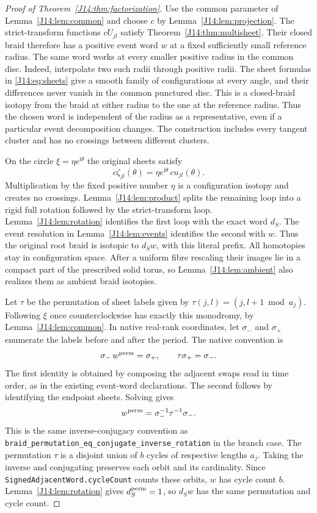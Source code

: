 \documentclass[11pt,oneside]{report}
\theoremstyle{definition}
\numberwithin{equation}{section}
\newcommand{\decl}[1]{\textnormal{\nolinkurl{#1}}}
\newcommand{\ii}{\mathrm i}
\begin{document}
\begin{proof}[Proof of Theorem~\ref{J14:thm:factorization}]
Use the common parameter of Lemma~\ref{J14:lem:common} and choose $c$ by
Lemma~\ref{J14:lem:projection}. The strict-transform functions $cU_{jl}$ satisfy
Theorem~\ref{J14:thm:multisheet}. Their closed braid therefore has a positive
event word $w$ at a fixed sufficiently small reference radius.
The same word works at every smaller positive radius in the common disc.
Indeed, interpolate two such radii through positive radii. The sheet
formulas in \eqref{J14:eq:sheets} give a smooth family of configurations at
every angle, and their differences never vanish in the common punctured
disc. This is a closed-braid isotopy from the braid at either radius to the
one at the reference radius. Thus the chosen word is independent of the
radius as a representative, even if a particular event decomposition
changes. The construction includes every tangent cluster and has no
crossings between different clusters.

On the circle $\xi=\eta e^{\ii\theta}$ the original sheets satisfy
\[
 c\zeta_{jl}(\theta)=\eta e^{\ii\theta}\,c u_{jl}(\theta).
\]
Multiplication by the fixed positive number $\eta$ is a configuration
isotopy and creates no crossings. Lemma~\ref{J14:lem:product} splits the remaining
loop into a rigid full rotation followed by the strict-transform loop.
Lemma~\ref{J14:lem:rotation} identifies the first loop with the exact word $d_S$.
The event resolution in Lemma~\ref{J14:lem:events} identifies the second with
$w$. Thus the original root braid is isotopic to $d_Sw$, with this literal
prefix. All homotopies stay in configuration space. After a uniform fibre
rescaling their images lie in a compact part of the prescribed solid torus,
so Lemma~\ref{J14:lem:ambient} also realizes them as ambient braid isotopies.

Let $\tau$ be the permutation of sheet labels given by
$\tau(j,l)=(j,l+1\bmod a_j)$. Following $\xi$ once counterclockwise has
exactly this monodromy, by Lemma~\ref{J14:lem:common}. In native real-rank
coordinates, let $\sigma_-$ and $\sigma_+$ enumerate the labels before and
after the period. The native convention is
\[
 \sigma_-\, w^{\rm perm}=\sigma_+,
 \qquad \tau\sigma_+=\sigma_-.
\]
The first identity is obtained by composing the adjacent swaps read in
time order, as in the existing event-word declarations. The second follows
by identifying the endpoint sheets. Solving gives
\begin{equation}\label{J14:eq:cycles}
 w^{\rm perm}=\sigma_-^{-1}\tau^{-1}\sigma_-.
\end{equation}
This is the same inverse-conjugacy convention as
\decl{braid_permutation_eq_conjugate_inverse_rotation} in the branch case.
The permutation $\tau$ is a disjoint union of $b$ cycles of respective
lengths $a_j$. Taking the inverse and conjugating preserves each orbit and
its cardinality. Since \decl{SignedAdjacentWord.cycleCount} counts these
orbits, $w$ has cycle count $b$. Lemma~\ref{J14:lem:rotation} gives
$d_S^{\rm perm}=1$, so $d_Sw$ has the same permutation and cycle count.
\end{proof}
\end{document}
